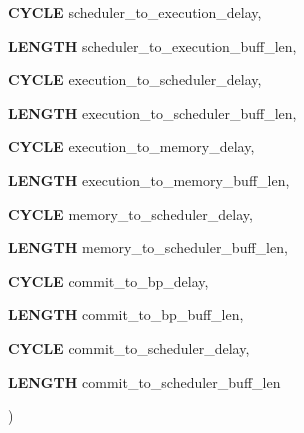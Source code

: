{{\begin{DoxyParamCaption}
\item[{{\bf CYCLE}}]{scheduler\_\-to\_\-execution\_\-delay, }
\item[{{\bf LENGTH}}]{scheduler\_\-to\_\-execution\_\-buff\_\-len, }
\item[{{\bf CYCLE}}]{execution\_\-to\_\-scheduler\_\-delay, }
\item[{{\bf LENGTH}}]{execution\_\-to\_\-scheduler\_\-buff\_\-len, }
\item[{{\bf CYCLE}}]{execution\_\-to\_\-memory\_\-delay, }
\item[{{\bf LENGTH}}]{execution\_\-to\_\-memory\_\-buff\_\-len, }
\item[{{\bf CYCLE}}]{memory\_\-to\_\-scheduler\_\-delay, }
\item[{{\bf LENGTH}}]{memory\_\-to\_\-scheduler\_\-buff\_\-len, }
\item[{{\bf CYCLE}}]{commit\_\-to\_\-bp\_\-delay, }
\item[{{\bf LENGTH}}]{commit\_\-to\_\-bp\_\-buff\_\-len, }
\item[{{\bf CYCLE}}]{commit\_\-to\_\-scheduler\_\-delay, }
\item[{{\bf LENGTH}}]{commit\_\-to\_\-scheduler\_\-buff\_\-len}
\end{DoxyParamCaption}
)}}
\label{classo3__sysCore_aec2fb988ddddbda8a4248d5b48b099e3}

